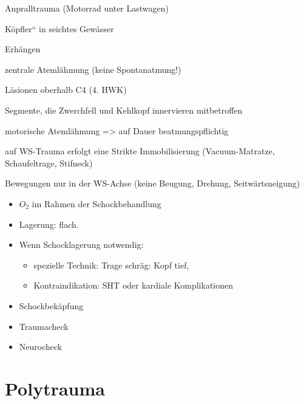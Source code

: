 Anpralltrauma (Motorrad unter Lastwagen)

{\quotedblbase}K\"opfler{\textquotedblleft} in seichtes Gew\"asser

Erh\"angen

zentrale Ateml\"ahmung (keine  Spontanatmung!)

L\"asionen oberhalb C4 (4. HWK)

Segmente, die Zwerchfell und Kehlkopf  innervieren mitbetroffen

motorische Ateml\"ahmung ={\textgreater} auf Dauer  beatmungspflichtig

\begin{gMassnahmenEnv}
    
     auf WS-Trauma erfolgt eine Strikte
    Immobilisierung (Vacuum-Matratze, Schaufeltrage, Stifneck)
    
    Bewegungen nur in der WS-Achse (keine  Beugung, Drehung,
    Seitw\"artsneigung)
    
    \gTxMassVitBes
    
    \begin{itemize}
        \item $O_2$ im Rahmen der Schockbehandlung
        \item Lagerung: flach.
        \item Wenn Schocklagerung notwendig:
        \begin{itemize}
            \item spezielle Technik: Trage schr\"ag: Kopf tief,
            \item Kontraindikation: SHT oder kardiale
            Komplikationen
        \end{itemize}
        \item Schockbekäpfung
        \item Traumacheck
        \item Neurocheck
    \end{itemize}
    
\end{gMassnahmenEnv}






\section{Polytrauma}

